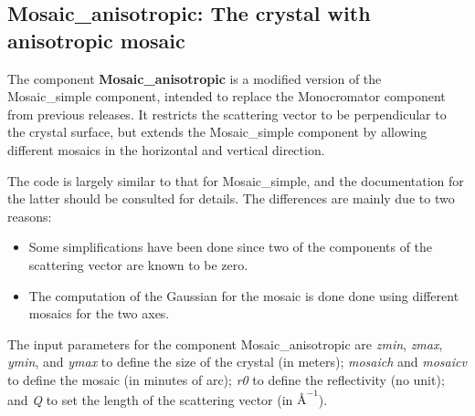 \subsection{Mosaic\_anisotropic: The crystal with anisotropic mosaic}

The component {\bf Mosaic\_anisotropic} is a modified version of the
Mosaic\_simple component, intended to replace the Monocromator component
from previous releases. It restricts the scattering vector to be
perpendicular to the crystal surface, but extends the Mosaic\_simple
component by allowing different mosaics in the horizontal and vertical
direction.

The code is largely similar to that for Mosaic\_simple, and the
documentation for the latter should be consulted for details. The
differences are mainly due to two reasons:
\begin{itemize}
\item Some simplifications have been done since two of the components of
  the scattering vector are known to be zero.
\item The computation of the Gaussian for the mosaic is done done using
  different mosaics for the two axes.
\end{itemize}

The input parameters for the component Mosaic\_anisotropic are
\textit{zmin}, \textit{zmax}, \textit{ymin}, and \textit{ymax} to define
the size of the crystal (in meters); \textit{mosaich} and \textit{mosaicv} to define
the mosaic (in minutes of arc); \textit{r0} to define the reflectivity
(no unit); and \textit{Q} to set the length of the scattering vector (in
$\mbox{\AA}^{-1}$).
